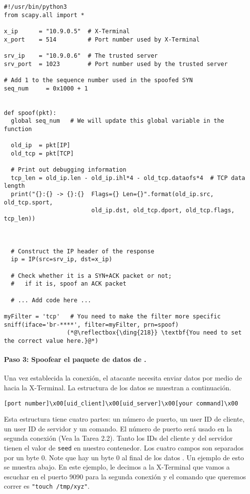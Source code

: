 \begin{lstlisting}
#!/usr/bin/python3
from scapy.all import *

x_ip      = "10.9.0.5"  # X-Terminal
x_port    = 514         # Port number used by X-Terminal

srv_ip    = "10.9.0.6"  # The trusted server
srv_port  = 1023        # Port number used by the trusted server

# Add 1 to the sequence number used in the spoofed SYN
seq_num     = 0x1000 + 1


def spoof(pkt):
  global seq_num   # We will update this global variable in the function

  old_ip  = pkt[IP]
  old_tcp = pkt[TCP]

  # Print out debugging information
  tcp_len = old_ip.len - old_ip.ihl*4 - old_tcp.dataofs*4  # TCP data length
  print("{}:{} -> {}:{}  Flags={} Len={}".format(old_ip.src, old_tcp.sport,
                         old_ip.dst, old_tcp.dport, old_tcp.flags, tcp_len))



  # Construct the IP header of the response
  ip = IP(src=srv_ip, dst=x_ip)

  # Check whether it is a SYN+ACK packet or not;
  #   if it is, spoof an ACK packet

  # ... Add code here ...

myFilter = 'tcp'   # You need to make the filter more specific
sniff(iface='br-****', filter=myFilter, prn=spoof)
                  (*@\reflectbox{\ding{218}} \textbf{You need to set the correct value here.}@*)   
\end{lstlisting}



\paragraph{Paso 3: Spoofear el paquete de datos de \rsh.}
Una vez establecida la conexión, el atacante necesita enviar datos por medio de \rsh hacia la X-Terminal.
La estructura de los datos \rsh se muestran a continuación.

\begin{lstlisting}
[port number]\x00[uid_client]\x00[uid_server]\x00[your command]\x00
\end{lstlisting}

Esta estructura tiene cuatro partes: un número de puerto, un user ID de cliente, un user ID de servidor y un comando.
El número de puerto será usado en la segunda conexión (Vea la Tarea 2.2).
Tanto los IDs del cliente y del servidor tienen el valor de \texttt{seed} en nuestro contenedor.
Los cuatro campos son separados por un byte 0.
Note que hay un byte 0 al final de los datos \rsh. 
Un ejemplo de esto se muestra abajo.
En este ejemplo, le decimos a la X-Terminal que vamos a escuchar en el puerto 9090 para la segunda conexión y el comando que queremos correr es \texttt{"touch /tmp/xyz"}. 

